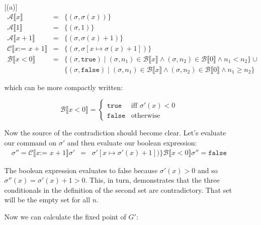 \documentclass[10pt, oneside]{article}
\begin{document}
\begin{enumerate}[1.]
\begin{enumerate} [(a)]
			\begin{eqnarray*}
			  \mathcal{A} \llbracket x \rrbracket & = & \{(\sigma, \sigma(x))\} \\
			  \mathcal{A} \llbracket 1 \rrbracket & = & \{(\sigma, 1)\} \\
			  \mathcal{A} \llbracket x + 1 \rrbracket & = & \{(\sigma, \sigma(x) + 1)\} \\
			  \mathcal{C} \llbracket x \texttt{:= } x + 1 \rrbracket & = & \{(\sigma, \sigma[x \mapsto \sigma(x) + 1])\} \\
			  \mathcal{B} \llbracket x < 0 \rrbracket & = & \{(\sigma, \texttt{true}) \mid (\sigma, n_1) \in \mathcal{B} \llbracket x \rrbracket \wedge (\sigma, n_2) \in \mathcal{B} \llbracket 0 \rrbracket \wedge n_1 < n_2\} \cup \\
			  & & \{(\sigma, \texttt{false}) \mid (\sigma,n_1) \in \mathcal{B} \llbracket x \rrbracket \wedge (\sigma, n_2) \in \mathcal{B} \llbracket 0 \rrbracket \wedge n_1 \geq n_2 \}
			\end{eqnarray*}
			
			which can be more compactly written:
			
			$$\mathcal{B} \llbracket x < 0 \rrbracket = \left \{ 
			  \begin{array}{lr} 
			    \texttt{true}  & \text{iff } \sigma'(x) < 0 \\
			    \texttt{false} & \text{otherwise}
			  \end{array} \right.$$
			    
		  Now the source of the contradiction should become clear. Let's evaluate
		  our command on $\sigma'$ and then evaluate our boolean expression:
			\begin{eqnarray*}
			  \sigma'' = \mathcal{C} \llbracket x \texttt{:= } x + 1 \rrbracket \sigma' & = & \sigma'[x \mapsto \sigma'(x) + 1])\}
			  \mathcal{B} \llbracket x < 0 \rrbracket \sigma'' = \texttt{false}
			\end{eqnarray*}
			
			The boolean expression evaluates to false because $\sigma'(x) > 0$ and so 
			$\sigma''(x) = \sigma'(x) + 1 > 0$. This, in turn, demonstrates that the 
			three conditionals in the definition of the second set are contradictory. 
			That set will be the empty set for all $n$. \checkmark
			
			
			Now we can calculate the fixed point of $G'$:
			

\end{enumerate}
\end{enumerate}
\end{document}
